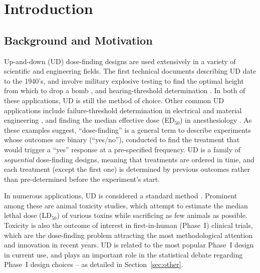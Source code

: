 

\doublespacing




\section{Introduction}
\subsection{Background and Motivation}

Up-and-down (UD) dose-finding designs are used extensively in a variety of scientific and engineering fields. The first technical documents describing UD date to the 1940's, and involve military explosive testing to find the optimal height from which to drop a bomb  \citep{Ande:McCa:Tuke:Stai:1946,Dixo:Mood:Amet:1948}, and hearing-threshold determination \citep{vonB:anew:1947}. In both of these applications, UD is still the method of choice. Other common UD applications include failure-threshold determination in electrical and material engineering \citep{Lago:Sons:Comp:2004}, and finding the median effective dose (ED$_{50}$) in anesthesiology \citep{Pace:styl:tutor:2007}. As these examples suggest, ``dose-finding'' is a general term to describe experiments whose outcomes are binary (``yes/no''), conducted to find the treatment that would trigger a ``yes'' response at a pre-specified frequency. UD is a family of \emph{sequential} dose-finding designs, meaning that treatments are ordered in time, and each treatment (except the first one) is determined by previous outcomes rather than pre-determined before the experiment's start.

In numerous applications, UD is considered a standard method \citep{JSME81, ASTM:Stan:1991,OECD:Revi:1998,NIEH:NIH:2001}. Prominent among these are animal toxicity studies, which attempt to estimate the median lethal dose (LD$_{50}$) of various toxins while sacrificing as few animals as possible. Toxicity is also the outcome of interest in first-in-human (Phase~I) clinical trials, which are the dose-finding problem attracting the most methodological attention and innovation in recent years. UD is related to the most popular Phase~I design in current use, and plays an important role in the statistical debate regarding Phase~I design choices -- as detailed in Section~\ref{sec:other}.

